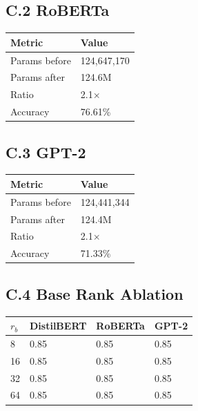 \subsection{C.2 RoBERTa}

\begin{table}[H]
\centering
\small
\begin{tabular}{ll}
\toprule
\textbf{Metric} & \textbf{Value} \\
\midrule
Params before & 124,647,170 \\
Params after & 124.6M \\
Ratio & 2.1$\times$ \\
Accuracy & 76.61\% \\
\bottomrule
\end{tabular}
\end{table}

\subsection{C.3 GPT-2}

\begin{table}[H]
\centering
\small
\begin{tabular}{ll}
\toprule
\textbf{Metric} & \textbf{Value} \\
\midrule
Params before & 124,441,344 \\
Params after & 124.4M \\
Ratio & 2.1$\times$ \\
Accuracy & 71.33\% \\
\bottomrule
\end{tabular}
\end{table}

\subsection{C.4 Base Rank Ablation}

\begin{table}[H]
\centering
\small
\begin{tabular}{llll}
\toprule
\textbf{$r_b$} & \textbf{DistilBERT} & \textbf{RoBERTa} & \textbf{GPT-2} \\
\midrule
8 & 0.85 & 0.85 & 0.85 \\
16 & 0.85 & 0.85 & 0.85 \\
32 & 0.85 & 0.85 & 0.85 \\
64 & 0.85 & 0.85 & 0.85 \\
\bottomrule
\end{tabular}
\end{table}

